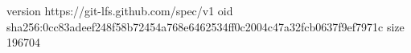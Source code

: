 version https://git-lfs.github.com/spec/v1
oid sha256:0cc83adeef248f58b72454a768e6462534ff0c2004c47a32fcb0637f9ef7971c
size 196704
